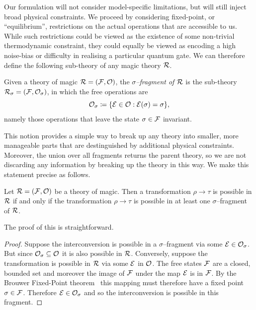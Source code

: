 \documentclass[pra,
aps,
twocolumn,
superscriptaddress,
groupedaddress,
nofootinbib,
reprint
]{revtex4-1}
\begin{document}
Our formulation will not consider model-specific limitations, but will still inject broad physical constraints. We proceed by considering fixed-point, or ``equilibrium'', restrictions on the actual operations that are accessible to us. While such restrictions could be viewed as the existence of some non-trivial thermodynamic constraint, they could equally be viewed as encoding a high noise-bias or difficulty in realising a particular quantum gate. We can therefore define the following sub-theory of any magic theory $\mathcal{R}$.
\begin{definition}\label{def:sigmafrag}
   Given a theory of magic $\mathcal{R} = (\mathcal{F}, \mathcal{O})$, the \emph{$\sigma$--fragment of $\mathcal{R}$} is the sub-theory $\mathcal{R}_\sigma = (\mathcal{F}, \mathcal{O}_\sigma)$, in which the free operations are 
   \begin{equation}
        \mathcal{O}_\sigma \coloneqq \{ \mathcal{E} \in \mathcal{O}: \mathcal{E}(\sigma) = \sigma \},
    \end{equation}
namely those operations that leave the state $\sigma \in \mathcal{F}$ invariant.
\end{definition}
This notion provides a simple way to break up any theory into smaller, more manageable parts that are destinguished by additional physical constraints. Moreover, the union over all fragments returns the parent theory, so we are not discarding any information by breaking up the theory in this way. We make this statement precise as follows.
\begin{theorem}\label{thm:frag}
    Let $\mathcal{R} = (\mathcal{F}, \mathcal{O})$ be a theory of magic.
Then a transformation $\rho \longrightarrow \tau$ is possible in $\mathcal{R}$ if and only if the transformation $\rho \longrightarrow \tau$ is possible in at least one $\sigma$--fragment of $\mathcal{R}$.
\end{theorem}
The proof of this is straightforward.
\begin{proof}
    Suppose the interconversion is possible in a $\sigma$--fragment via some $\mathcal{E} \in \mathcal{O}_\sigma$. But since $\mathcal{O}_\sigma \subseteq \mathcal{O}$ it is also possible in $\mathcal{R}$. Conversely, suppose the transformation is possible in $\mathcal{R}$ via some $\mathcal{E}$ in $\mathcal{O}$. The free states $\mathcal{F}$ are a closed, bounded set and moreover the image of $\mathcal{F}$ under the map $\mathcal{E}$ is in $\mathcal{F}$. By the Brouwer Fixed-Point theorem~\cite{cit:brouwer} this mapping must therefore have a fixed point $\sigma \in \mathcal{F}$. Therefore $\mathcal{E} \in \mathcal{O}_\sigma$ and so the interconversion is possible in this fragment.
\end{proof}
\end{document}

